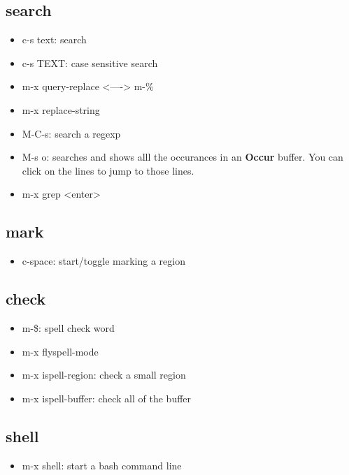 \documentclass[11pt]{article}
\begin{document}
\subsection{search}
\label{sec:org315cc50}
\begin{itemize}
\item c-s text: search
\item c-s TEXT: case sensitive search
\item m-x query-replace <----> m-\%
\item m-x replace-string

\item M-C-s: search a regexp

\item M-s o: searches and shows alll the occurances in an \textbf{Occur} buffer. You can click on the lines to jump to those lines.

\item m-x grep <enter>
\end{itemize}

\subsection{mark}
\label{sec:org38d1dcd}
\begin{itemize}
\item c-space: start/toggle marking a region
\end{itemize}

\subsection{check}
\label{sec:orge4b6fc0}

\begin{itemize}
\item m-\$: spell check word
\item m-x flyspell-mode
\item m-x ispell-region: check a small region
\item m-x ispell-buffer: check all of the buffer
\end{itemize}

\subsection{shell}
\label{sec:orge9a042c}
\begin{itemize}
\item m-x shell: start a bash command line
\end{itemize}
\end{document}
